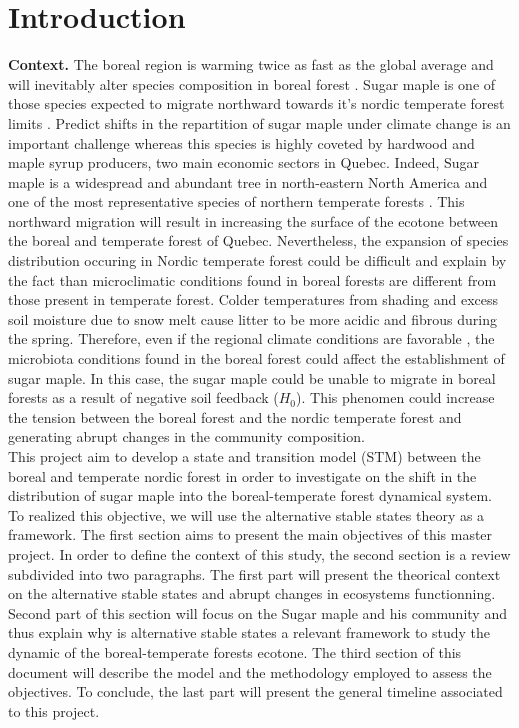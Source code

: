 


\newpage
\setcounter{page}{1}

\section{Introduction}

\textbf{Context.}  The boreal region is warming twice as fast as the global
average and will inevitably alter species composition in boreal forest
\cite{Scheffer2012,Hughes2000}.  Sugar maple is one of those species expected
to migrate northward towards it's nordic temperate forest limits
\cite{McKENNEY2007,Goldblum2005}. Predict shifts in the repartition of sugar
maple under climate change is an important challenge whereas this species is
highly coveted by hardwood and maple syrup producers, two main economic
sectors in Quebec. Indeed, Sugar maple is a widespread and abundant tree in
north-eastern North America and one of the most representative species of
northern temperate forests \cite{Graignic2013,Messaoud2007,Kellman2004}. This
northward migration will result in increasing the surface of the ecotone
between the boreal and temperate forest of Quebec. Nevertheless, the expansion
of species distribution occuring in Nordic temperate forest could be difficult
and explain by the fact than microclimatic conditions found in boreal forests
are different from those present in temperate forest. Colder temperatures from
shading and excess soil moisture due to snow melt cause litter to be more
acidic and fibrous during the spring. Therefore, even if the regional climate
conditions are favorable \cite{Kellman2004}, the microbiota conditions found
in the boreal forest could affect the establishment of sugar
maple\cite{Kellman2004,Moore2008,DeFrenne2013}. In this case, the sugar maple
could be unable to migrate in boreal forests as a result of negative soil
feedback (\textbf{$H_0$}). This phenomen could increase the tension between
the boreal forest and the nordic temperate forest and generating abrupt
changes in the community composition.\\

This project aim to develop a state and transition model (STM) between the
boreal and temperate nordic forest in order to investigate on the shift in the
distribution of sugar maple into the boreal-temperate forest dynamical system.
To realized this objective, we will use the alternative stable states theory
as a framework. The first section aims to present the main objectives of this
master project. In order to define the context of this study, the second
section is a review subdivided into two paragraphs. The first part will
present the theorical context on the alternative stable states and abrupt
changes in ecosystems functionning. Second part of this section will focus on
the Sugar maple and his community and thus explain why is alternative stable
states a relevant framework to study the dynamic of the boreal-temperate
forests ecotone.  The third section of this document will describe the model
and the methodology employed to assess the objectives. To conclude, the last
part will present the general timeline associated to this project.

